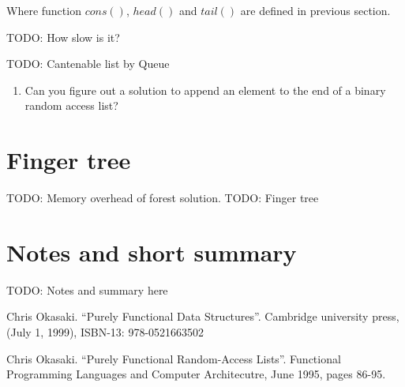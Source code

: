 \documentclass{article}
\begin{document}
Where function $cons()$, $head()$ and $tail()$ are defined in previous section.

TODO: How slow is it?

TODO: Cantenable list by Queue

\begin{Exercise}
\begin{enumerate}
\item Can you figure out a solution to append an element to the end of a binary
random access list?
\end{enumerate}
\end{Exercise}

\section{Finger tree}
TODO: Memory overhead of forest solution.
TODO: Finger tree


\section{Notes and short summary}

TODO: Notes and summary here


\begin{thebibliography}{99}

Chris Okasaki. ``Purely Functional Data Structures''. Cambridge university press, (July 1, 1999), ISBN-13: 978-0521663502

Chris Okasaki. ``Purely Functional Random-Access Lists''. Functional Programming Languages and Computer Architecutre, June 1995, pages 86-95.

\end{thebibliography}

\ifx\wholebook\relax \else
\end{document}
